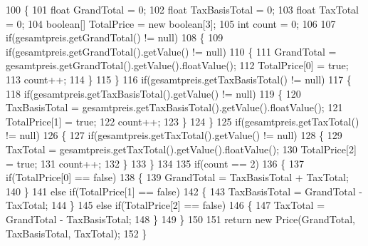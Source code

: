 \begin{DoxyCode}
100     \{
101         \textcolor{keywordtype}{float} GrandTotal = 0;
102         \textcolor{keywordtype}{float} TaxBasisTotal = 0;
103         \textcolor{keywordtype}{float} TaxTotal = 0;
104         \textcolor{keywordtype}{boolean}[] TotalPrice = \textcolor{keyword}{new} \textcolor{keywordtype}{boolean}[3];
105         \textcolor{keywordtype}{int} count = 0;
106         
107         \textcolor{keywordflow}{if}(gesamtpreis.getGrandTotal() != null)
108         \{
109             \textcolor{keywordflow}{if}(gesamtpreis.getGrandTotal().getValue() != null)
110             \{
111                 GrandTotal = gesamtpreis.getGrandTotal().getValue().floatValue();
112                 TotalPrice[0] = \textcolor{keyword}{true};
113                 count++;
114             \}
115         \}
116         \textcolor{keywordflow}{if}(gesamtpreis.getTaxBasisTotal() != null)
117         \{
118             \textcolor{keywordflow}{if}(gesamtpreis.getTaxBasisTotal().getValue() != null)
119             \{
120                 TaxBasisTotal = gesamtpreis.getTaxBasisTotal().getValue().floatValue();
121                 TotalPrice[1] = \textcolor{keyword}{true};
122                 count++;
123             \}
124         \}
125         \textcolor{keywordflow}{if}(gesamtpreis.getTaxTotal() != null)
126         \{
127             \textcolor{keywordflow}{if}(gesamtpreis.getTaxTotal().getValue() != null)
128             \{
129                 TaxTotal = gesamtpreis.getTaxTotal().getValue().floatValue();
130                 TotalPrice[2] = \textcolor{keyword}{true};
131                 count++;
132             \}
133         \}
134         
135         \textcolor{keywordflow}{if}(count == 2)
136         \{
137             \textcolor{keywordflow}{if}(TotalPrice[0] == \textcolor{keyword}{false})
138             \{
139                 GrandTotal = TaxBasisTotal + TaxTotal;              
140             \}
141             \textcolor{keywordflow}{else} \textcolor{keywordflow}{if}(TotalPrice[1] == \textcolor{keyword}{false})
142             \{
143                 TaxBasisTotal = GrandTotal - TaxTotal;
144             \}
145             \textcolor{keywordflow}{else} \textcolor{keywordflow}{if}(TotalPrice[2] == \textcolor{keyword}{false})
146             \{
147                 TaxTotal = GrandTotal - TaxBasisTotal;
148             \}
149         \}
150         
151         \textcolor{keywordflow}{return} \textcolor{keyword}{new} Price(GrandTotal, TaxBasisTotal, TaxTotal);
152     \}
\end{DoxyCode}
